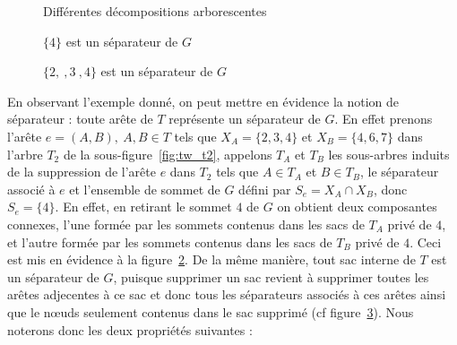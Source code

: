 \begin{figure}
    \begin{center}
        \subfloat[$T_1$]{\label{fig:tw_t1}
            \begin{tikzpicture}
                
            \end{tikzpicture}
        }
        \subfloat[$T_2$]{\label{fig:tw_t2}
            \begin{tikzpicture}
                
            \end{tikzpicture}
        }
        \subfloat[$T_3$]{\label{fig:tw_t3}
            \begin{tikzpicture}
                
            \end{tikzpicture}
        }
        \caption{Différentes décompositions arborescentes}
        \label{tw_trees}
    \end{center}
\end{figure}

\begin{figure}
    \begin{center}
        \begin{tikzpicture}
            
        \end{tikzpicture}
        \caption{$\{4\}$ est un séparateur de $G$}
        \label{tw_sep}
    \end{center}
\end{figure}

\begin{figure}
    \begin{center}
        \begin{tikzpicture}
            
        \end{tikzpicture}
        \caption{$\{2,\ ,3\ ,4\}$ est un séparateur de $G$}
        \label{tw_bsep}
    \end{center}
\end{figure}


En observant l'exemple donné, on peut mettre en évidence la notion de séparateur : toute arête de
$T$ représente un séparateur de $G$. En effet prenons l'arête $e = (A, B),\ A, B \in T$ tels que
$X_A = \{2, 3, 4\}$ et $X_B = \{4, 6, 7\}$ dans l'arbre $T_2$ de la sous-figure~\ref{fig:tw_t2},
appelons $T_A$ et $T_B$ les sous-arbres induits de la suppression de l'arête $e$ dans $T_2$ tels que
$A \in T_A$ et $B \in T_B$, le séparateur associé à $e$ et l'ensemble de sommet de $G$ défini par
$S_e = X_A \cap X_B$, donc $S_e = \{4\}$. En effet, en retirant le sommet $4$ de $G$ on obtient deux
composantes connexes, l'une formée par les sommets contenus dans les sacs de $T_A$ privé de $4$, et
l'autre formée par les sommets contenus dans les sacs de $T_B$ privé de $4$. Ceci est mis en
évidence à la figure~\ref{tw_sep}. De la même manière, tout sac interne de $T$ est un séparateur de
$G$, puisque supprimer un sac revient à supprimer toutes les arêtes adjecentes à ce sac et donc tous
les séparateurs associés à ces arêtes ainsi que le n\oe uds seulement contenus dans le sac supprimé
(cf figure~\ref{tw_bsep}). Nous noterons donc les deux propriétés suivantes :

